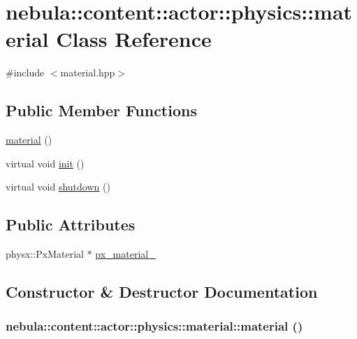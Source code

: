 \hypertarget{classnebula_1_1content_1_1actor_1_1physics_1_1material}{
\section{nebula::content::actor::physics::material Class Reference}
\label{classnebula_1_1content_1_1actor_1_1physics_1_1material}
}


{\ttfamily \#include $<$material.hpp$>$}\subsection*{Public Member Functions}
\begin{DoxyCompactItemize}
\item 
\hyperlink{classnebula_1_1content_1_1actor_1_1physics_1_1material_a2803be8bf8cae893ae68a0f84b6ec3b2}{material} ()
\item 
virtual void \hyperlink{classnebula_1_1content_1_1actor_1_1physics_1_1material_ab66ce559d5f555910a456b0b9f8c6da0}{init} ()
\item 
virtual void \hyperlink{classnebula_1_1content_1_1actor_1_1physics_1_1material_ad568cfeea6afe00ad0b653bef4bf5a7b}{shutdown} ()
\end{DoxyCompactItemize}
\subsection*{Public Attributes}
\begin{DoxyCompactItemize}
\item 
physx::PxMaterial $\ast$ \hyperlink{classnebula_1_1content_1_1actor_1_1physics_1_1material_a7b9868ba375cb4abac9c9217f69e62ee}{px\_\-material\_\-}
\end{DoxyCompactItemize}


\subsection{Constructor \& Destructor Documentation}
\hypertarget{classnebula_1_1content_1_1actor_1_1physics_1_1material_a2803be8bf8cae893ae68a0f84b6ec3b2}{
\subsubsection[{material}]{\setlength{\rightskip}{0pt plus 5cm}nebula::content::actor::physics::material::material ()}}
\label{classnebula_1_1content_1_1actor_1_1physics_1_1material_a2803be8bf8cae893ae68a0f84b6ec3b2}


